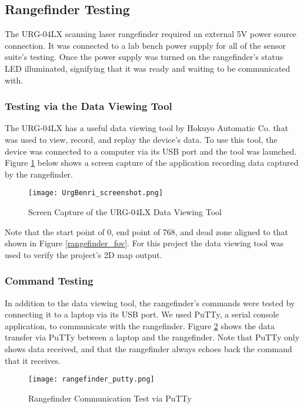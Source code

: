 \subsection{Rangefinder Testing}
The URG-04LX scanning laser rangefinder required an external 5V power source connection. It was connected to a lab bench power supply for all of the sensor suite's testing. Once the power supply was turned on the rangefinder's status LED illuminated, signifying that it was ready and waiting to be communicated with.

\subsubsection{Testing via the Data Viewing Tool}
The URG-04LX has a useful data viewing tool by Hokuyo Automatic Co. that was used to view, record, and replay the device's data. To use this tool, the device was connected to a computer via its USB port and the tool was launched. Figure \ref{URGBenriStandard_pic} below shows a screen capture of the application recording data captured by the rangefinder.

\begin{figure}[H]
	\centerline{\texttt{[image: UrgBenri\_screenshot.png]}}
	\caption{Screen Capture of the URG-04LX Data Viewing Tool \cite{URGBenriStandard_ref}}
	\label{URGBenriStandard_pic}
\end{figure}

Note that the start point of 0, end point of 768, and dead zone aligned to that shown in Figure \ref{rangefinder_fov}. For this project the data viewing tool was used to verify the project's 2D map output.

\subsubsection{Command Testing}
In addition to the data viewing tool, the rangefinder's commands were tested by connecting it to a laptop via its USB port. We used PuTTy, a serial console application, to communicate with the rangefinder. Figure \ref{rangefinder_putty} shows the data transfer via PuTTy between a laptop and the rangefinder. Note that PuTTy only shows data received, and that the rangefinder always echoes back the command that it receives.

\begin{figure}[H]
	\centerline{\texttt{[image: rangefinder\_putty.png]}}
	\caption{Rangefinder Communication Test via PuTTy}
	\label{rangefinder_putty}
\end{figure}

